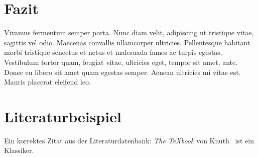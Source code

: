 \documentclass[twocolumn]{article}
\begin{document}
\section{Fazit}
Vivamus fermentum semper porta. Nunc diam velit, adipiscing ut tristique vitae, sagittis vel odio. Maecenas convallis ullamcorper ultricies. Pellentesque habitant morbi tristique senectus et netus et malesuada fames ac turpis egestas. Vestibulum tortor quam, feugiat vitae, ultricies eget, tempor sit amet, ante. Donec eu libero sit amet quam egestas semper. Aenean ultricies mi vitae est. Mauris placerat eleifend leo.

\section{Literaturbeispiel}
Ein korrektes Zitat aus der Literaturdatenbank: \emph{The \TeX book} von Knuth~\citep{knuth1984texbook} ist ein Klassiker.


\end{document}
